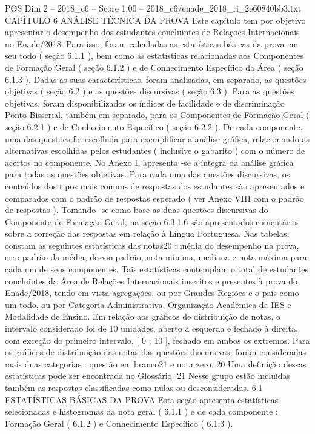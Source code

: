 \begin{textsample}{POS Dim 2 – 2018\_c6 – Score 1.00 – 2018\_c6/enade\_2018\_ri\_2e60840bb3.txt}  \label{ex:f2_pos_198}
CAPÍTULO 6 ANÁLISE TÉCNICA DA PROVA Este capítulo tem por objetivo apresentar o desempenho dos estudantes concluintes de Relações Internacionais no Enade/2018.
Para isso, foram calculadas as estatísticas básicas da prova em seu todo ( seção 6.1.1 ), bem como as estatísticas relacionadas aos Componentes de Formação Geral ( seção 6.1.2 ) e de Conhecimento Específico da Área ( seção 6.1.3 ).
Dadas as suas características, foram analisadas, em separado, as questões objetivas ( seção 6.2 ) e as questões discursivas ( seção 6.3 ).
Para as questões objetivas, foram disponibilizados os índices de facilidade e de discriminação Ponto-Bisserial, também em separado, para os Componentes de Formação Geral ( seção 6.2.1 ) e de Conhecimento Específico ( seção 6.2.2 ).
De cada componente, uma das questões foi escolhida para exemplificar a análise gráfica, relacionando as alternativas escolhidas pelos estudantes ( inclusive o gabarito ) com o número de acertos no componente.
No Anexo I, apresenta -se a íntegra da análise gráfica para todas as questões objetivas.
Para cada uma das questões discursivas, os conteúdos dos tipos mais comuns de respostas dos estudantes são apresentados e comparados com o padrão de respostas esperado ( ver Anexo VIII com o padrão de respostas ).
Tomando -se como base as duas questões discursivas do Componente de Formação Geral, na seção 6.3.1.6 são apresentados comentários sobre a correção das respostas em relação à Língua Portuguesa.
Nas tabelas, constam as seguintes estatísticas das notas20 : média do desempenho na prova, erro padrão da média, desvio padrão, nota mínima, mediana e nota máxima para cada um de seus componentes.
Tais estatísticas contemplam o total de estudantes concluintes da Área de Relações Internacionais inscritos e presentes à prova do Enade/2018, tendo em vista agregações, ou por Grandes Regiões e o país como um todo, ou por Categoria Administrativa, Organização Acadêmica da IES e Modalidade de Ensino.
Em relação aos gráficos de distribuição de notas, o intervalo considerado foi de 10 unidades, aberto à esquerda e fechado à direita, com exceção do primeiro intervalo, [ 0 ; 10 ], fechado em ambos os extremos.
Para os gráficos de distribuição das notas das questões discursivas, foram consideradas mais duas categorias : questão em branco21 e nota zero. 20 Uma definição dessas estatísticas pode ser encontrada no Glossário. 21 Nesse grupo estão incluídas também as respostas classificadas como nulas ou desconsideradas. 6.1 ESTATÍSTICAS BÁSICAS DA PROVA Esta seção apresenta estatísticas selecionadas e histogramas da nota geral ( 6.1.1 ) e de cada componente : Formação Geral ( 6.1.2 ) e Conhecimento Específico ( 6.1.3 ).

\end{textsample}
